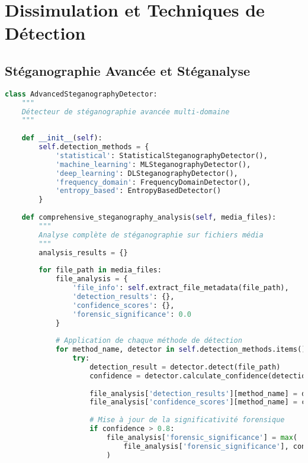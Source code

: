 \section{Dissimulation et Techniques de Détection}

\subsection{Stéganographie Avancée et Stéganalyse}

\begin{lstlisting}[language=Python, caption=Système de détection de stéganographie multi-domaine]
class AdvancedSteganographyDetector:
    """
    Détecteur de stéganographie avancée multi-domaine
    """
    
    def __init__(self):
        self.detection_methods = {
            'statistical': StatisticalSteganographyDetector(),
            'machine_learning': MLSteganographyDetector(),
            'deep_learning': DLSteganographyDetector(),
            'frequency_domain': FrequencyDomainDetector(),
            'entropy_based': EntropyBasedDetector()
        }
        
    def comprehensive_steganography_analysis(self, media_files):
        """
        Analyse complète de stéganographie sur fichiers média
        """
        analysis_results = {}
        
        for file_path in media_files:
            file_analysis = {
                'file_info': self.extract_file_metadata(file_path),
                'detection_results': {},
                'confidence_scores': {},
                'forensic_significance': 0.0
            }
            
            # Application de chaque méthode de détection
            for method_name, detector in self.detection_methods.items():
                try:
                    detection_result = detector.detect(file_path)
                    confidence = detector.calculate_confidence(detection_result)
                    
                    file_analysis['detection_results'][method_name] = detection_result
                    file_analysis['confidence_scores'][method_name] = confidence
                    
                    # Mise à jour de la significativité forensique
                    if confidence > 0.8:
                        file_analysis['forensic_significance'] = max(
                            file_analysis['forensic_significance'], confidence
                        )
                        

\end{lstlisting}
